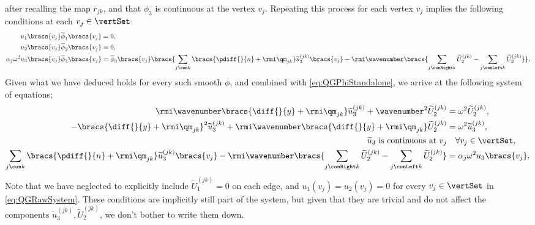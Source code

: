 after recalling the map $r_{jk}$, and that $\phi_3$ is continuous at the vertex $v_j$.
Repeating this process for each vertex $v_j$ implies the following conditions at each $v_j\in\vertSet$: 
\begin{align*}
	u_1\bracs{v_j}\overline{\phi}_1\bracs{v_j} &= 0, \\
	u_2\bracs{v_j}\overline{\phi}_2\bracs{v_j} &= 0, \\
	\alpha_j \omega^2 u_3\bracs{v_j} \overline{\phi}_3\bracs{v_j} 
	&= \overline{\phi}_3\bracs{v_j} \bracs{ \sum_{j\con k} \bracs{ \pdiff{}{n} + \rmi\qm_{jk} }\widetilde{u}_3^{(jk)}\bracs{v_j} - \rmi\wavenumber\bracs{ \sum_{j\conRight k} \widetilde{U}_2^{(jk)} - \sum_{j\conLeft k} \widetilde{U}_2^{(jk)} } }.
\end{align*}
Given what we have deduced holds for every such smooth $\phi$, and combined with \eqref{eq:QGPhiStandalone}, we arrive at the following system of equations;
\begin{subequations} \label{eq:QGRawSystem}
	\begin{align}
		\rmi\wavenumber \bracs{ \diff{}{y} + \rmi\qm_{jk} }\widetilde{u}_3^{(jk)} + \wavenumber^2\widetilde{U}_2^{(jk)} &= \omega^2\widetilde{U}_2^{(jk)}, \label{eq:QGPhi2} \\
		-\bracs{ \diff{}{y} + \rmi\qm_{jk} }^2\widetilde{u}_3^{(jk)} + \rmi\wavenumber\bracs{ \diff{}{y} + \rmi\qm_{jk} }\widetilde{U}_2^{(jk)} &= \omega^2 \widetilde{u}_3^{(jk)}, \label{eq:QGPhi3} \\
		\widetilde{u}_3 \text{ is continuous at } v_j &\quad\forall v_j\in\vertSet, \label{eq:QGContinuity} \\
		\sum_{j\con k} \bracs{ \pdiff{}{n} + \rmi\qm_{jk} }\widetilde{u}_3^{(jk)}\bracs{v_j} - \rmi\wavenumber\bracs{ \sum_{j\conRight k} \widetilde{U}_2^{(jk)} - \sum_{j\conLeft k} \widetilde{U}_2^{(jk)} } 
		&= \alpha_j \omega^2 u_3\bracs{v_j}. \label{eq:QGVertexCondition}
	\end{align}
\end{subequations}
Note that we have neglected to explicitly include $\widetilde{U}_1^{(jk)}=0$ on each edge, and $u_1(v_j)=u_2(v_j)=0$ for every $v_j\in\vertSet$ in \eqref{eq:QGRawSystem}.
These conditions are implicitly still part of the system, but given that they are trivial and do not affect the components $\widetilde{u}_3^{(jk)}, \widetilde{U}_2^{(jk)}$, we don't bother to write them down.

